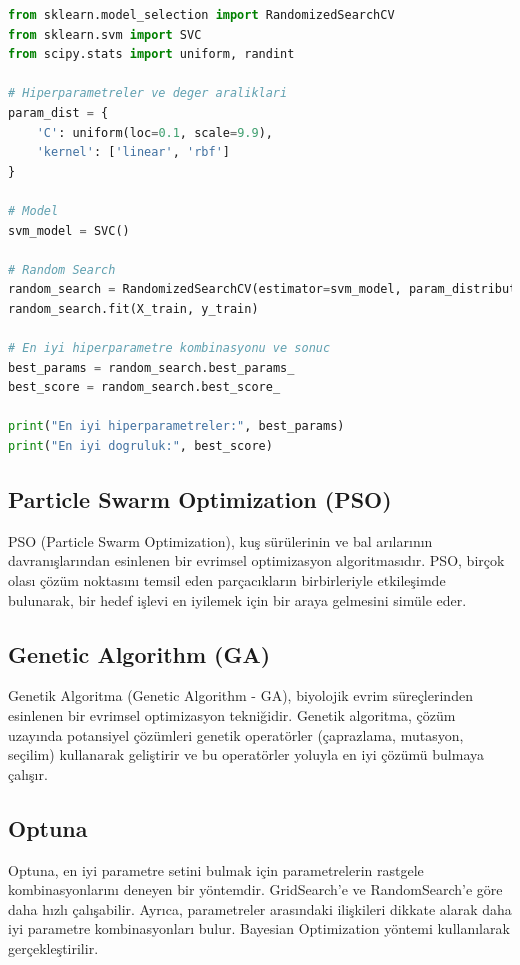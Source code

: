 \begin{lstlisting}[language=Python]
from sklearn.model_selection import RandomizedSearchCV
from sklearn.svm import SVC
from scipy.stats import uniform, randint

# Hiperparametreler ve deger araliklari
param_dist = {
    'C': uniform(loc=0.1, scale=9.9),
    'kernel': ['linear', 'rbf']
}

# Model
svm_model = SVC()

# Random Search
random_search = RandomizedSearchCV(estimator=svm_model, param_distributions=param_dist, n_iter=10, cv=5, scoring='accuracy')
random_search.fit(X_train, y_train)

# En iyi hiperparametre kombinasyonu ve sonuc
best_params = random_search.best_params_
best_score = random_search.best_score_

print("En iyi hiperparametreler:", best_params)
print("En iyi dogruluk:", best_score)
\end{lstlisting}

\subsection{Particle Swarm Optimization (PSO)}
PSO (Particle Swarm Optimization), kuş sürülerinin ve bal arılarının davranışlarından esinlenen bir evrimsel optimizasyon algoritmasıdır.
PSO, birçok olası çözüm noktasını temsil eden parçacıkların birbirleriyle etkileşimde bulunarak, bir hedef işlevi en iyilemek için bir araya gelmesini simüle eder.

\subsection{Genetic Algorithm (GA)}
Genetik Algoritma (Genetic Algorithm - GA), biyolojik evrim süreçlerinden esinlenen bir evrimsel optimizasyon tekniğidir. 
Genetik algoritma, çözüm uzayında potansiyel çözümleri genetik operatörler (çaprazlama, mutasyon, seçilim) kullanarak geliştirir 
ve bu operatörler yoluyla en iyi çözümü bulmaya çalışır. 

\subsection{Optuna}
Optuna, en iyi parametre setini bulmak için parametrelerin rastgele kombinasyonlarını deneyen bir yöntemdir. GridSearch'e ve RandomSearch'e göre daha hızlı çalışabilir. Ayrıca, parametreler arasındaki ilişkileri dikkate alarak daha iyi parametre kombinasyonları bulur. Bayesian Optimization yöntemi kullanılarak gerçekleştirilir.

